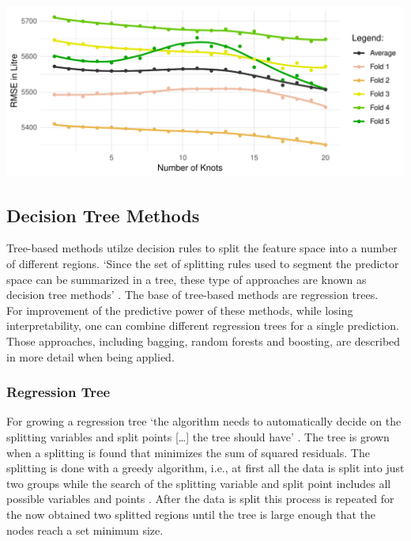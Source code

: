 \documentclass[11pt,]{article}
\let\origfigure\figure
\let\endorigfigure\endfigure
\renewenvironment{figure}[1][2] {
    \expandafter\origfigure\expandafter[H]
} {
    \endorigfigure
}
\begin{document}
\begin{figure}

\includegraphics{../00_data/output_paper/08_splines} \hfill{}

\caption[RMSE Values of Different Spline Models]{\label{fig:splines}Regression with Splines: Dependency Between Knots and RMSE.}\label{fig:splines}
\end{figure}

\hypertarget{decision-tree-methods}{%
\subsection{Decision Tree Methods}\label{decision-tree-methods}}

Tree-based methods utilze decision rules to split the feature space into
a number of different regions. `Since the set of splitting rules used to
segment the predictor space can be summarized in a tree, these type of
approaches are known as decision tree methods'
\autocite[][p. 303]{Hastie2013}. The base of tree-based methods are
regression trees.\\
For improvement of the predictive power of these methods, while losing
interpretability, one can combine different regression trees for a
single prediction. Those approaches, including bagging, random forests
and boosting, are described in more detail when being applied.

\hypertarget{regression-tree}{%
\subsubsection{Regression Tree}\label{regression-tree}}

For growing a regression tree `the algorithm needs to automatically
decide on the splitting variables and split points {[}\ldots{]} the tree
should have' \autocite[][p. 349]{Hastie2013}. The tree is grown when a
splitting is found that minimizes the sum of squared residuals. The
splitting is done with a greedy algorithm, i.e., at first all the data
is split into just two groups while the search of the splitting variable
and split point includes all possible variables and points
\autocite[cf.][p. 349]{Hastie2013}. After the data is split this process
is repeated for the now obtained two splitted regions until the tree is
large enough that the nodes reach a set minimum size.
\end{document}
